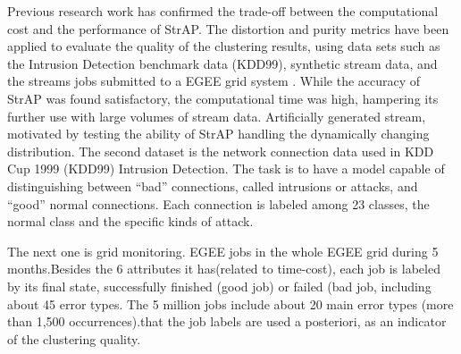 Previous research work has confirmed the trade-off between the computational cost and the performance of StrAP. The distortion and purity metrics have been applied to evaluate the quality of the clustering results, using data sets such as the Intrusion Detection benchmark data (KDD99), synthetic stream data, and the streams jobs submitted to a EGEE grid system \cite{zhang2008data}. While the accuracy of StrAP was found satisfactory, the computational time was high, hampering its further use with large volumes of stream data.  
Artificially generated stream, motivated by testing the ability of StrAP handling the dynamically changing distribution.
The second dataset is the network connection data used in KDD Cup 1999 (KDD99) Intrusion Detection. The task is to have a model capable of distinguishing between “bad” connections, called intrusions or attacks, and “good” normal connections. Each connection is labeled among 23 classes, the normal class and the specific kinds of attack.

The next one is grid monitoring. EGEE jobs in the whole EGEE grid during 5 months.Besides the 6 attributes it has(related to time-cost), each job is labeled by its final state, successfully finished (good job) or failed (bad job, including about 45 error types. The 5 million jobs include about 20 main error types (more than 1,500 occurrences).that the job labels are used a posteriori, as an indicator of the clustering quality.







